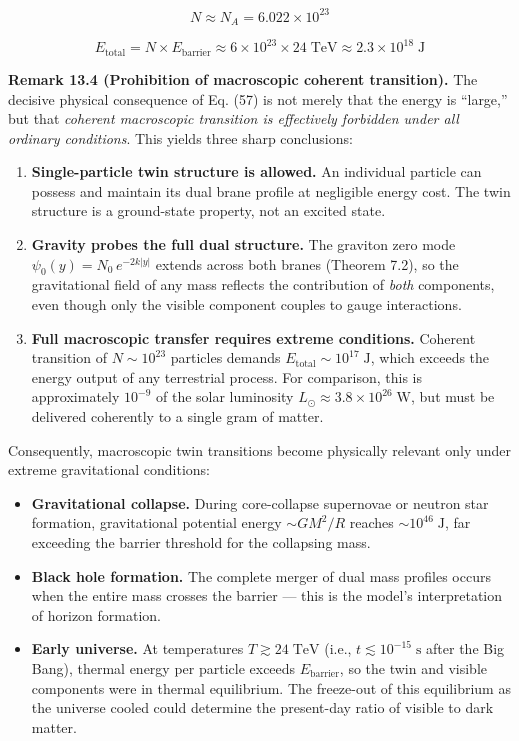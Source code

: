 \documentclass[
  11pt,
]{article}
\providecommand{\tightlist}{%
  \setlength{\itemsep}{0pt}\setlength{\parskip}{0pt}}
\begin{document}
\[N \approx N_A = 6.022 \times 10^{23} \tag{56}\]

\[E_{\text{total}} = N \times E_{\text{barrier}} \approx 6 \times 10^{23} \times 24\;\text{TeV} \approx 2.3 \times 10^{18}\;\text{J} \tag{57}\]

\textbf{Remark 13.4 (Prohibition of macroscopic coherent transition).}
The decisive physical consequence of Eq. (57) is not merely that the
energy is ``large,'' but that \emph{coherent macroscopic transition is
effectively forbidden under all ordinary conditions}. This yields three
sharp conclusions:

\begin{enumerate}
\def\labelenumi{\arabic{enumi}.}
\item
  \textbf{Single-particle twin structure is allowed.} An individual
  particle can possess and maintain its dual brane profile at negligible
  energy cost. The twin structure is a ground-state property, not an
  excited state.
\item
  \textbf{Gravity probes the full dual structure.} The graviton zero
  mode \(\psi_0(y) = N_0\,e^{-2k|y|}\) extends across both branes
  (Theorem 7.2), so the gravitational field of any mass reflects the
  contribution of \emph{both} components, even though only the visible
  component couples to gauge interactions.
\item
  \textbf{Full macroscopic transfer requires extreme conditions.}
  Coherent transition of \(N \sim 10^{23}\) particles demands
  \(E_{\text{total}} \sim 10^{17}\;\text{J}\), which exceeds the energy
  output of any terrestrial process. For comparison, this is
  approximately \(10^{-9}\) of the solar luminosity
  \(L_\odot \approx 3.8 \times 10^{26}\;\text{W}\), but must be
  delivered coherently to a single gram of matter.
\end{enumerate}

Consequently, macroscopic twin transitions become physically relevant
only under extreme gravitational conditions:

\begin{itemize}
\tightlist
\item
  \textbf{Gravitational collapse.} During core-collapse supernovae or
  neutron star formation, gravitational potential energy \(\sim GM^2/R\)
  reaches \(\sim 10^{46}\;\text{J}\), far exceeding the barrier
  threshold for the collapsing mass.
\item
  \textbf{Black hole formation.} The complete merger of dual mass
  profiles occurs when the entire mass crosses the barrier --- this is
  the model's interpretation of horizon formation.
\item
  \textbf{Early universe.} At temperatures \(T \gtrsim 24\;\text{TeV}\)
  (i.e., \(t \lesssim 10^{-15}\;\text{s}\) after the Big Bang), thermal
  energy per particle exceeds \(E_{\text{barrier}}\), so the twin and
  visible components were in thermal equilibrium. The freeze-out of this
  equilibrium as the universe cooled could determine the present-day
  ratio of visible to dark matter.
\end{itemize}
\end{document}
